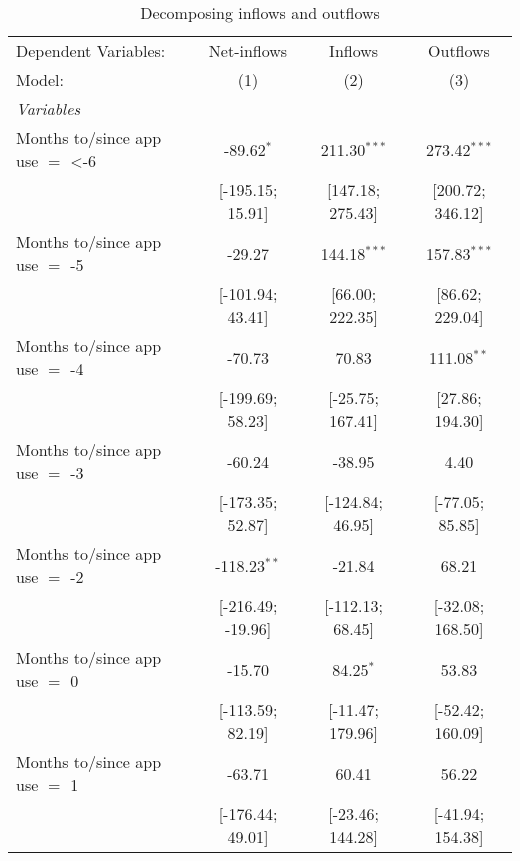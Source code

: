 
\begin{table}[htbp]
   \centering
   \tiny
   \begin{threeparttable}[b]
      \caption{\label{tab:reg_decomp_inout} Decomposing inflows and outflows}
      \begin{tabular}{lccc}
         \tabularnewline \midrule \midrule
         Dependent Variables:            & Net-inflows       & Inflows          & Outflows\\  
         Model:                          & (1)               & (2)              & (3)\\  
         \midrule
         \emph{Variables}\\
         Months to/since app use $=$ <-6 & -89.62$^{*}$      & 211.30$^{***}$   & 273.42$^{***}$\\   
                                         & [-195.15; 15.91]  & [147.18; 275.43] & [200.72; 346.12]\\   
         Months to/since app use $=$ -5  & -29.27            & 144.18$^{***}$   & 157.83$^{***}$\\   
                                         & [-101.94; 43.41]  & [66.00; 222.35]  & [86.62; 229.04]\\   
         Months to/since app use $=$ -4  & -70.73            & 70.83            & 111.08$^{**}$\\   
                                         & [-199.69; 58.23]  & [-25.75; 167.41] & [27.86; 194.30]\\   
         Months to/since app use $=$ -3  & -60.24            & -38.95           & 4.40\\   
                                         & [-173.35; 52.87]  & [-124.84; 46.95] & [-77.05; 85.85]\\   
         Months to/since app use $=$ -2  & -118.23$^{**}$    & -21.84           & 68.21\\   
                                         & [-216.49; -19.96] & [-112.13; 68.45] & [-32.08; 168.50]\\   
         Months to/since app use $=$ 0   & -15.70            & 84.25$^{*}$      & 53.83\\   
                                         & [-113.59; 82.19]  & [-11.47; 179.96] & [-52.42; 160.09]\\   
         Months to/since app use $=$ 1   & -63.71            & 60.41            & 56.22\\   
                                         & [-176.44; 49.01]  & [-23.46; 144.28] & [-41.94; 154.38]\\   

\end{tabular}
\end{threeparttable}
\end{table}

